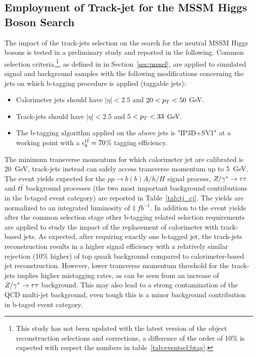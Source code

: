 \subsection{ Employment of Track-jet for the MSSM Higgs Boson Search} %
The impact of the track-jets selection on the search for the neutral MSSM Higgs bosons is tested in a 
preliminary study and reported in the  following. 
Common selection criteria,\footnote{This study has not been updated with the latest version of the object reconstruction 
		selections and corrections, a difference of the order of 10\% is expected with respect the 
	    	numbers in table~\ref{tab:eventsel:btag}.},
as defined in in Section~\ref{sec:presel}, are applied to simulated signal and background samples with the following modifications
concerning the jets on which b-tagging procedure is applied (taggable jets):
\begin{itemize}
\item Calorimeter jets should have $|\eta| < 2.5$ and $20 < p_{T} < 50$ GeV.
\item Track-jets should have $|\eta| < 2.5$ and $5 < p_{T} < 33$ GeV.
\item The b-tagging algorithm applied on the above jets is "IP3D+SV1" at a 
	working point with a $\epsilon_b^{t\bar{t}}=70$\% tagging efficiency.
\end{itemize}
The minimum transverse momentum for which calorimeter jet are calibrated is 20~GeV, track-jets instead can 
safely access transverse momentum up to 5~GeV.
The event yields expected for the $pp \rightarrow b(b)A/h/H$ signal process, $Z/\gamma^*\rightarrow \tau\tau$  and $t\bar{t}$ background processes
(the two most important background contributions in the b-taged event category) 
are reported in Table~\ref{tab:tj_cj}. The yields are  normalized to an integrated luminosity of $1 ~ fb^{-1}$.
In addition to the event yields after the common selection stage other b-tagging related selection
requirements  are applied to study the impact of the replacement of calorimeter with track-based jets.
As expected, after requiring exactly one b-tagged jet, the track-jets reconstruction 
results in a higher signal efficiency with a relatively similar rejection (10\% higher) of top quark 
background compared to calorimeter-based jet reconstruction.
However, lower transverse momentum threshold for the  track-jets implies higher mistagging rates,
as can be seen from an increase of $Z/\gamma^*\rightarrow \tau\tau$ background. This may also lead to a strong contamination of the 
QCD multi-jet background, even tough this is a minor background contribution in b-taged event category.


